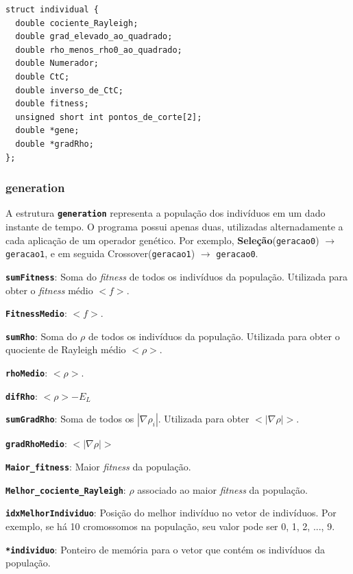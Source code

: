 \vspace{1 cm}	
\begin{lstlisting}
struct individual {
  double cociente_Rayleigh;
  double grad_elevado_ao_quadrado;
  double rho_menos_rho0_ao_quadrado;
  double Numerador;
  double CtC;
  double inverso_de_CtC;
  double fitness;
  unsigned short int pontos_de_corte[2];
  double *gene;
  double *gradRho;
};
\end{lstlisting}
\vspace{1 cm}

\subsubsection{generation}

		A estrutura \texttt{\textbf{generation}} representa a população dos indivíduos em um dado instante de tempo. O programa possui apenas duas, utilizadas alternadamente a cada aplicação de um operador genético. Por exemplo, \textbf{Seleção}(\texttt{geracao0}) $\rightarrow$ \texttt{geracao1}, e em seguida Crossover(\texttt{geracao1}) $\rightarrow$ \texttt{geracao0}.

	\textbf{\texttt{sumFitness}}: Soma do \emph{fitness} de todos os indivíduos da população. Utilizada para obter o \emph{fitness} médio $<f>$.
	
  \textbf{\texttt{FitnessMedio}}: $<f>$.
	
	\textbf{\texttt{sumRho}}: Soma do $\rho$ de todos os indivíduos da população. Utilizada para obter o quociente de Rayleigh médio $<\rho>$.
	
  \textbf{\texttt{rhoMedio}}: $<\rho>$.
	
  \textbf{\texttt{difRho}}: $<\rho> - E_L$
	
  \textbf{\texttt{sumGradRho}}: Soma de todos os $|\nabla \rho_i|$. Utilizada para obter $<|\nabla \rho|>$.
	
  \textbf{\texttt{gradRhoMedio}}: $<|\nabla \rho|>$
	
  \textbf{\texttt{Maior\_fitness}}: Maior \emph{fitness} da população.
	
  \textbf{\texttt{Melhor\_cociente\_Rayleigh}}: $\rho$ associado ao maior \emph{fitness} da população.
	
	\textbf{\texttt{idxMelhorIndividuo}}: Posição do melhor indivíduo no vetor de indivíduos. Por exemplo, se há 10 cromossomos na população, seu valor pode ser 0, 1, 2, ..., 9.
	
  \textbf{\texttt{*individuo}}: Ponteiro de memória para o vetor que contém os indivíduos da população.
	

